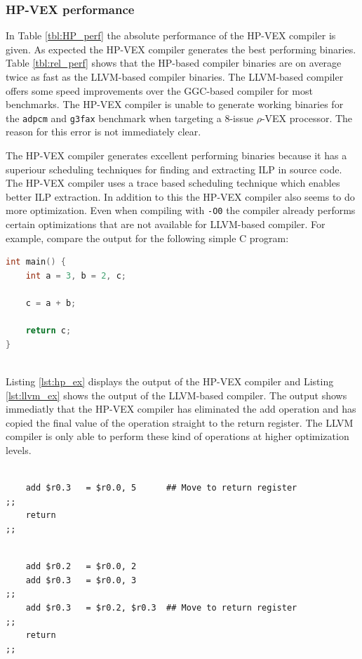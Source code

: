 \subsubsection{HP-VEX performance}
In Table \ref{tbl:HP_perf} the absolute performance of the HP-VEX compiler is given. As expected the HP-VEX compiler generates the best performing binaries. Table \ref{tbl:rel_perf} shows that the HP-based compiler binaries are on average twice as fast as the LLVM-based compiler binaries. The LLVM-based compiler offers some speed improvements over the GGC-based compiler for most benchmarks. The HP-VEX compiler is unable to generate working binaries for the \texttt{adpcm} and \texttt{g3fax} benchmark when targeting a 8-issue $\rho$-VEX processor. The reason for this error is not immediately clear.

The HP-VEX compiler generates excellent performing binaries because it has a superiour scheduling techniques for finding and extracting ILP in source code. The HP-VEX compiler uses a trace based scheduling technique which enables better ILP extraction. In addition to this the HP-VEX compiler also seems to do more optimization. Even when compiling with \texttt{-O0} the compiler already performs certain optimizations that are not available for LLVM-based compiler. For example, compare the output for the following simple C program:

\begin{lstlisting}[language=c]
int main() {
	int a = 3, b = 2, c;

	c = a + b;

	return c;
}
	
\end{lstlisting}

Listing \ref{lst:hp_ex} displays the output of the HP-VEX compiler and Listing \ref{lst:llvm_ex} shows the output of the LLVM-based compiler. The output shows immediatly that the HP-VEX compiler has eliminated the add operation and has copied the final value of the operation straight to the return register. The LLVM compiler is only able to perform these kind of operations at higher optimization levels.

\begin{lstlisting}[language=rvex,label=lst:hp_ex, caption={HP compiler output}]

	add $r0.3   = $r0.0, 5  	## Move to return register
;;
	return
;;
\end{lstlisting}

\begin{lstlisting}[language=rvex,label=lst:llvm_ex, caption={LLVM compiler output}]

	add $r0.2 	= $r0.0, 2
	add $r0.3 	= $r0.0, 3	
;;
	add $r0.3   = $r0.2, $r0.3  ## Move to return register
;;
	return
;;
\end{lstlisting}

